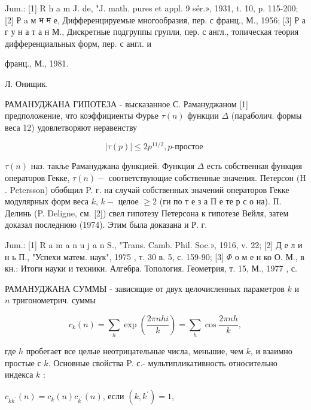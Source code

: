 \documentclass[10pt]{article}
\begin{document}
Jum.: [1] R h a m J. de, "J. math. pures et appl. 9 sér.», 1931, t. 10, p. 115-200; [2] Р a м भ म е, Дифференцируемые многообразия, пер. с франц., М., 1956; [3] Р а г у н а т а н М., Дискретные подгруппы групли, пер. с англ., топическая теория дифференциальных форм, пер. с англ. и

франц., М., 1981.

Л. Онищик.



РАМАНУДЖАНА ГИПОТЕЗА - высказанное С. Рамануджаном [1] предположение, что коэффициенты Фурье $\tau(n)$ функции $\Delta$ (параболич. формы веса 12) удовлетворяют неравенству



\[

|\tau(p)| \leqslant 2 p^{11 / 2}, p \text {-простое }

\]



$\tau(n)$ наз. такље Рамануджана функцией. Функция $\Delta$ есть собственная функция операторов Гекке, $\tau(n)-$ соответствующие собственные значения. Петерсон $(\mathrm{H}$. Petersson) обөбщил P. г. на случай собственных значений операторов Гекке модулярных форм веса $k$, $k-$ целое $\geqslant 2$ (ги по т е з а П е те р с о на). П. Делинь (P. Deligne, см. [2]) свел гипотезу Петерсона к гипотезе Вейля, затем доказал последнюю (1974). Этим была доказана и Р. г.



Jum.: [1] R a m a n u j a n S., "Trans. Camb. Phil. Soc.», 1916, v. 22; [2] Д е л и н ь П., "Успехи матем. наук", 1975 , т. 30 в. 5, с. 159-90; [3] $\Phi$ о м е н ко О. М., в кн.: Итоги науки и техники. Алгебра. Топология. Геометрия, т. 15, М., 1977 , с.



РАМАНУДЖАНА СУММЫ - зависящие от двух целочисленных параметров $k$ и $n$ тригонометрич. суммы



\[

c_{k}(n)=\sum_{h} \exp \left(\frac{2 \pi n h i}{k}\right)=\sum_{h} \cos \frac{2 \pi n h}{k},

\]



где $h$ пробегает все целые неотрицательные числа, меньшие, чем $k$, и взаимно простые с $k$. Основные свойства P. с.- мультипликативность относительно индекса $k$ :



$c_{k k^{\prime}}(n)=c_{k}(n) c_{k^{\prime}}(n)$, если $\left(k, k^{\prime}\right)=1$,
\end{document}

